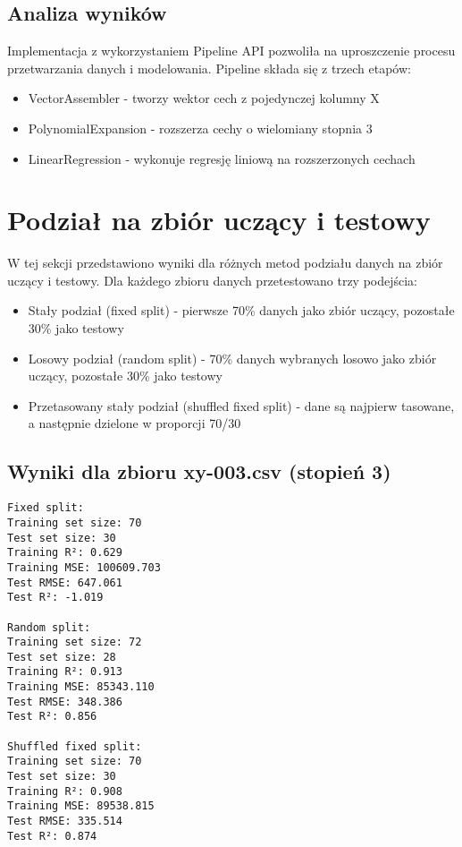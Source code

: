 \documentclass{article}
\begin{document}
\subsection{Analiza wyników}
Implementacja z wykorzystaniem Pipeline API pozwoliła na uproszczenie procesu przetwarzania danych i modelowania. Pipeline składa się z trzech etapów:
\begin{itemize}
    \item VectorAssembler - tworzy wektor cech z pojedynczej kolumny X
    \item PolynomialExpansion - rozszerza cechy o wielomiany stopnia 3
    \item LinearRegression - wykonuje regresję liniową na rozszerzonych cechach
\end{itemize}

\section{Podział na zbiór uczący i testowy}
W tej sekcji przedstawiono wyniki dla różnych metod podziału danych na zbiór uczący i testowy. Dla każdego zbioru danych przetestowano trzy podejścia:
\begin{itemize}
    \item Stały podział (fixed split) - pierwsze 70\% danych jako zbiór uczący, pozostałe 30\% jako testowy
    \item Losowy podział (random split) - 70\% danych wybranych losowo jako zbiór uczący, pozostałe 30\% jako testowy
    \item Przetasowany stały podział (shuffled fixed split) - dane są najpierw tasowane, a następnie dzielone w proporcji 70/30
\end{itemize}

\subsection{Wyniki dla zbioru xy-003.csv (stopień 3)}
\begin{verbatim}
Fixed split:
Training set size: 70
Test set size: 30
Training R²: 0.629
Training MSE: 100609.703
Test RMSE: 647.061
Test R²: -1.019

Random split:
Training set size: 72
Test set size: 28
Training R²: 0.913
Training MSE: 85343.110
Test RMSE: 348.386
Test R²: 0.856

Shuffled fixed split:
Training set size: 70
Test set size: 30
Training R²: 0.908
Training MSE: 89538.815
Test RMSE: 335.514
Test R²: 0.874
\end{verbatim}
\end{document}
